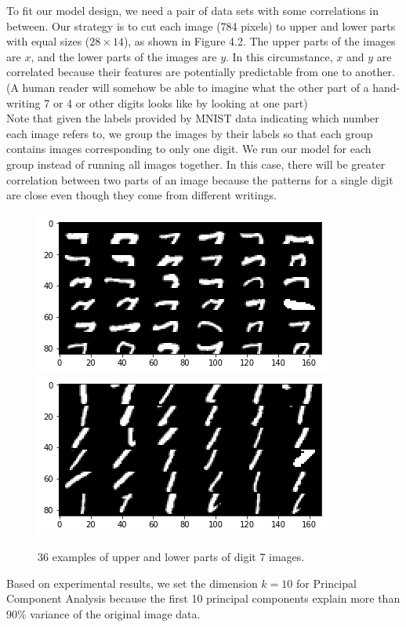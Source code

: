 \documentclass[12pt]{report} %
\begin{document}
To fit our model design, we need a pair of data sets with some correlations in between. Our strategy is to cut each image (784 pixels) to upper and lower parts with equal sizes ($28 \times 14$), as shown in Figure 4.2. The upper parts of the images are $x$, and the lower parts of the images are $y$. In this circumstance, $x$ and $y$ are correlated because their features are potentially predictable from one to another. (A human reader will somehow be able to imagine what the other part of a hand-writing 7 or 4 or other digits looks like by looking at one part)\\
Note that given the labels provided by MNIST data indicating which number each image refers to, we group the images by their labels so that each group contains images corresponding to only one digit. We run our model for each group instead of running all images together. In this case, there will be greater correlation between two parts of an image because the patterns for a single digit are close even though they come from different writings.
\begin{figure}[H]
	\centering
	\includegraphics[scale=0.8]{pictures/MNIST_up.png}
	\includegraphics[scale=0.8]{pictures/MNIST_down.png}
	\caption{36 examples of upper and lower parts of digit 7 images.}
	\label{fig:2}
\end{figure}
Based on experimental results, we set the dimension $k=10$ for Principal Component Analysis because the first 10 principal components explain more than 90\% variance of the original image data.
\end{document}
